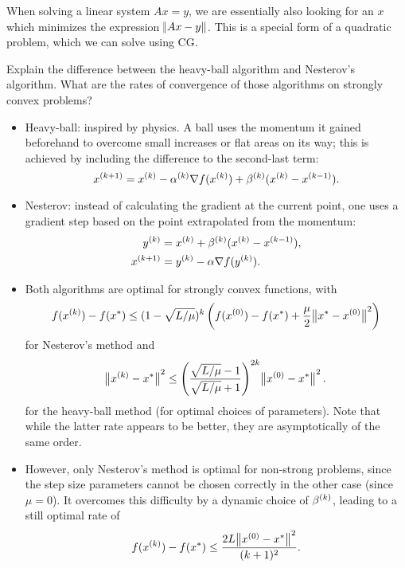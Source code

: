 \documentclass{article}
\begin{document}
When solving a linear system \(Ax = y\), we are essentially also looking for an \(x\) which
minimizes the expression \(\enVert{Ax - y}\).  This is a special form of a quadratic problem, which
we can solve using CG.

\begin{question}
  Explain the difference between the heavy-ball algorithm and Nesterov’s algorithm.  What are the
  rates of convergence of those algorithms on strongly convex problems?
\end{question}
\begin{itemize}
\item Heavy-ball: inspired by physics.  A ball uses the momentum it gained beforehand to overcome
  small increases or flat areas on its way; this is achieved by including the difference to the
  second-last term:
  \begin{equation*}
    \kth[k+1]{x} = \kth{x} - \kth{\alpha} \nabla f(\kth{x}) + \kth{\beta}(\kth{x} - \kth[k-1]{x}).
  \end{equation*}
\item Nesterov: instead of calculating the gradient at the current point, one uses a gradient step
  based on the point extrapolated from the momentum:
  \begin{align*}
    \kth{y} &= \kth{x} + \kth{\beta}(\kth{x} - \kth[k-1]{x}), \\
    \kth[k+1]{x} &= \kth{y} - \alpha\nabla f(\kth{y}).
  \end{align*}
\item Both algorithms are optimal for strongly convex functions, with
    \begin{equation*}
    f(\kth{x}) - f(x^*) \leq (1 - \sqrt{L/\mu})^k
    \left( f(\kth[0]{x}) - f(x^*) + \frac{\mu}{2} \enVert[1]{x^* - \kth[0]{x}}^2 \right)
  \end{equation*}
  for Nesterov's method and
  \begin{equation*}
    \enVert[1]{\kth{x} - x^*}^2 \leq
    \left( \frac{\sqrt{L/\mu} - 1}{\sqrt{L/\mu} + 1} \right)^{2k} \enVert[1]{\kth[0]{x} - x^*}^2.
  \end{equation*}
  for the heavy-ball method (for optimal choices of parameters).  Note that while the latter rate
  appears to be better, they are asymptotically of the same order.
\item However, only Nesterov's method is optimal for non-strong problems, since the step size
  parameters cannot be chosen correctly in the other case (since \(\mu = 0\)).  It overcomes this
  difficulty by a dynamic choice of \(\kth{\beta}\), leading to a still optimal rate of
  \begin{equation*}
    f(\kth{x}) - f(x^*) \leq \frac{2L\enVert[1]{\kth[0]{x} - x^*}^2}{(k + 1)^2}.
  \end{equation*}
\end{itemize}
\end{document}
